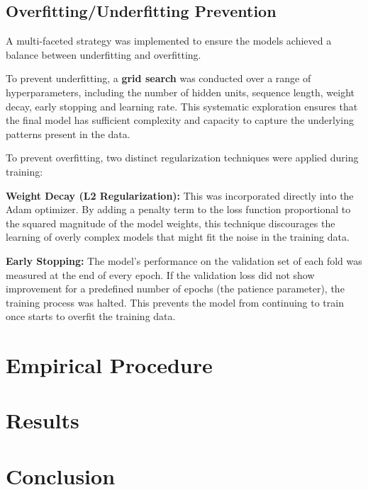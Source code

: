 \documentclass[conference, 10pt]{IEEEtran}
\begin{document}
\subsection{Overfitting/Underfitting Prevention}
A multi-faceted strategy was implemented to ensure the models achieved a balance between underfitting and overfitting.

To prevent underfitting, a \textbf{grid search} was conducted over a range of hyperparameters, including the number of hidden
units, sequence length, weight decay, early stopping and learning rate. This systematic exploration ensures that the
final model has sufficient complexity and capacity to capture the underlying patterns present in the data.

To prevent overfitting, two distinct regularization techniques were applied during training:

\textbf{Weight Decay (L2 Regularization):} This was incorporated directly into the Adam optimizer. By adding a penalty term to
the loss function proportional to the squared magnitude of the model weights, this technique discourages the learning of
overly complex models that might fit the noise in the training data.

\textbf{Early Stopping:} The model's performance on the validation set of each fold was measured at the end of every epoch. If
the validation loss did not show improvement for a predefined number of epochs (the patience parameter), the training
process was halted. This prevents the model from continuing to train once starts to overfit the training data.

\section{Empirical Procedure}

\section{Results}

\section{Conclusion}
\cite{yahoosnp500}
\cite{yahoovix}
\cite{elec_cons}


\nocite{myrepo}

\end{document}
